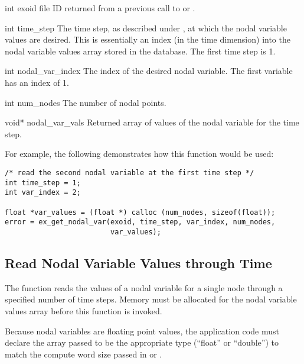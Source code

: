\begin{parameters}
\item[{int exoid \R{}}]
\exo{} file ID returned from a previous call to  
or .

\item[{int time_step \R{}}]
The time step, as described under , at which the
nodal variable values are desired. This is essentially an index (in
the time dimension) into the nodal variable values array stored in the
database. The first time step is 1.

\item[{int nodal_var_index \R{}}]
The index of the desired nodal variable. The first variable 
has an index of 1.

\item[{int num_nodes \R{}}]
The number of nodal points.

\item[{void* nodal_var_vals \W{}}]
Returned array of  values of the \th{}
nodal variable for the \th{} time step.
\end{parameters}

For example, the following demonstrates how this function would be
used:

\begin{lstlisting}
/* read the second nodal variable at the first time step */
int time_step = 1;
int var_index = 2;

float *var_values = (float *) calloc (num_nodes, sizeof(float));
error = ex_get_nodal_var(exoid, time_step, var_index, num_nodes,
                         var_values);
\end{lstlisting}


\subsection{Read Nodal Variable Values through Time}

The function  reads the values of a
nodal variable for a single node through a specified number of time
steps. Memory must be allocated for the nodal variable values array
before this function is invoked.

Because nodal variables are floating point values, the application
code must declare the array passed to be the appropriate type
(``float'' or ``double'') to match the compute word size passed
in  or .

